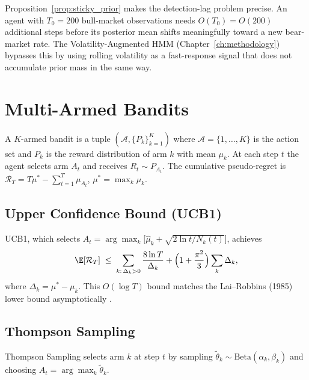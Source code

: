 \begin{remark}
Proposition~\ref{prop:sticky_prior} makes the detection-lag problem precise.
An agent with $T_0 = 200$ bull-market observations needs $O(T_0) = O(200)$
additional steps before its posterior mean shifts meaningfully toward a new
bear-market rate.  The Volatility-Augmented HMM (Chapter~\ref{ch:methodology})
bypasses this by using rolling volatility as a fast-response signal that does
not accumulate prior mass in the same way.
\end{remark}

\section{Multi-Armed Bandits}

\begin{definition}
\label{def:mab}
A $K$-armed bandit is a tuple $(\mathcal{A},\{P_k\}_{k=1}^K)$ where
$\mathcal{A}=\{1,\ldots,K\}$ is the action set and $P_k$ is the reward
distribution of arm $k$ with mean $\mu_k$.  At each step $t$ the agent
selects arm $A_t$ and receives $R_t \sim P_{A_t}$.  The cumulative
pseudo-regret is
$\mathcal{R}_T = T\mu^* - \sum_{t=1}^T \mu_{A_t}$, $\mu^* = \max_k\mu_k$.
\end{definition}

\subsection{Upper Confidence Bound (UCB1)}

\begin{theorem}
\label{thm:ucb_regret}
UCB1, which selects $A_t = \arg\max_k\bigl[\hat\mu_k + \sqrt{2\ln t / N_k(t)}\bigr]$,
achieves
\[
    \E[\mathcal{R}_T] \;\leq\;
    \sum_{k:\,\Delta_k > 0} \frac{8\ln T}{\Delta_k}
    + \Bigl(1+\frac{\pi^2}{3}\Bigr)\sum_k \Delta_k,
\]
where $\Delta_k = \mu^*-\mu_k$.  This $O(\log T)$ bound matches the
Lai--Robbins (1985) lower bound asymptotically \citep{lai1985asymptotically}.
\end{theorem}

\subsection{Thompson Sampling}

Thompson Sampling selects arm $k$ at step $t$ by sampling
$\tilde\theta_k \sim \mathrm{Beta}(\alpha_k,\beta_k)$ and choosing
$A_t = \arg\max_k\tilde\theta_k$.

